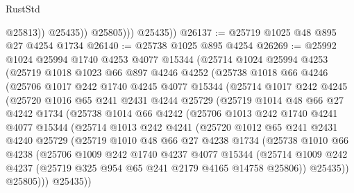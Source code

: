 \begin{lexlean}{RustStd}
\begin{coremodule}
                      @25813))
                  @25435))
              @25805)))
        @25435))
@26137 := @25719 @1025 @48 @895 @27 @4254 @1734
@26140 := @25738 @1025 @895 @4254
@26269 := @25992
    @1024
    @25994
    @1740
    @4253
    @4077
    @15344
    (@25714
      @1024
      @25994
      @4253
      (@25719
        @1018
        @1023
        @66
        @897
        @4246
        @4252
        (@25738
          @1018
          @66
          @4246
          (@25706
            @1017
            @242
            @1740
            @4245
            @4077
            @15344
            (@25714
              @1017
              @242
              @4245
              (@25720
                @1016
                @65
                @241
                @2431
                @4244
                @25729
                (@25719
                  @1014
                  @48
                  @66
                  @27
                  @4242
                  @1734
                  (@25738
                    @1014
                    @66
                    @4242
                    (@25706
                      @1013
                      @242
                      @1740
                      @4241
                      @4077
                      @15344
                      (@25714
                        @1013
                        @242
                        @4241
                        (@25720
                          @1012
                          @65
                          @241
                          @2431
                          @4240
                          @25729
                          (@25719
                            @1010
                            @48
                            @66
                            @27
                            @4238
                            @1734
                            (@25738
                              @1010
                              @66
                              @4238
                              (@25706
                                @1009
                                @242
                                @1740
                                @4237
                                @4077
                                @15344
                                (@25714
                                  @1009
                                  @242
                                  @4237
                                  (@25719 @325 @954 @65 @241 @2179 @4165 @14758 @25806))
                                @25435))
                            @25805)))
                      @25435))

\end{coremodule}
\end{lexlean}
